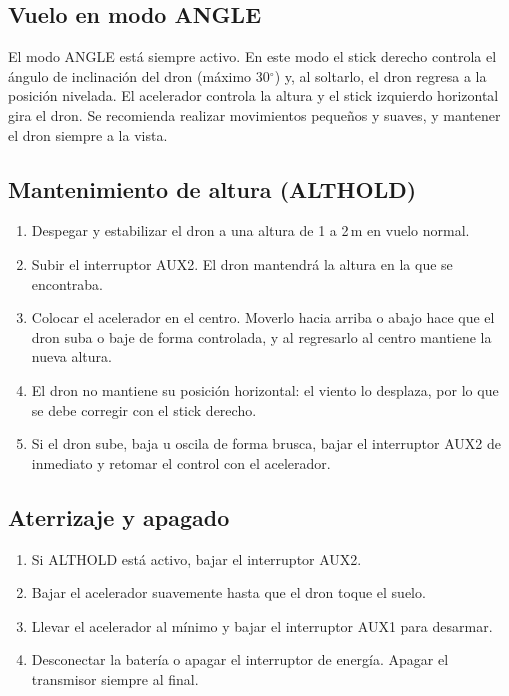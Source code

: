 \documentclass[11pt,letterpaper]{article}
\begin{document}
\subsection{Vuelo en modo ANGLE}
El modo ANGLE está siempre activo. En este modo el stick derecho controla el ángulo de inclinación del dron (máximo 30$^{\circ}$) y, al soltarlo, el dron regresa a la posición nivelada. El acelerador controla la altura y el stick izquierdo horizontal gira el dron. Se recomienda realizar movimientos pequeños y suaves, y mantener el dron siempre a la vista.

\subsection{Mantenimiento de altura (ALTHOLD)}
\begin{enumerate}[nosep]
    \item Despegar y estabilizar el dron a una altura de 1 a 2\,m en vuelo normal.
    \item Subir el interruptor AUX2. El dron mantendrá la altura en la que se encontraba.
    \item Colocar el acelerador en el centro. Moverlo hacia arriba o abajo hace que el dron suba o baje de forma controlada, y al regresarlo al centro mantiene la nueva altura.
    \item El dron no mantiene su posición horizontal: el viento lo desplaza, por lo que se debe corregir con el stick derecho.
    \item Si el dron sube, baja u oscila de forma brusca, bajar el interruptor AUX2 de inmediato y retomar el control con el acelerador.
\end{enumerate}

\subsection{Aterrizaje y apagado}
\begin{enumerate}[nosep]
    \item Si ALTHOLD está activo, bajar el interruptor AUX2.
    \item Bajar el acelerador suavemente hasta que el dron toque el suelo.
    \item Llevar el acelerador al mínimo y bajar el interruptor AUX1 para desarmar.
    \item Desconectar la batería o apagar el interruptor de energía. Apagar el transmisor siempre al final.
\end{enumerate}
\end{document}
